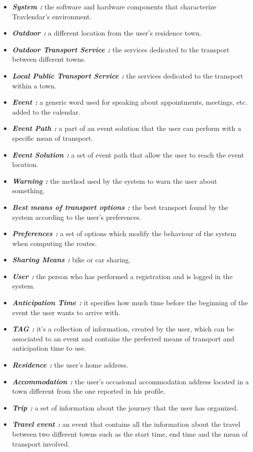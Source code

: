 \newpage
{}
\begin{itemize}
	\setlength{\leftskip}{0.5cm}
	\item \emph{\textbf{System : }}the software and hardware components that characterize Travlendar’s environment.
	\item \emph{\textbf{Outdoor : }}a different location from the user’s residence town.
	\item \emph{\textbf{Outdoor Transport Service : }}the services dedicated to the transport between different towns.
	\item \emph{\textbf{Local Public Transport Service : }}the services dedicated to the transport within a town.
	\item \emph{\textbf{Event : }}a generic word used for speaking about appointments, meetings, etc. added to the calendar.
	\item \emph{\textbf{Event Path : }}a part of an event solution that the user can perform with a specific mean of transport.
	\item \emph{\textbf{Event Solution : }}a set of event path that allow the user to reach the event location.
	\item \emph{\textbf{Warning : }}the method used by the system to warn the user about something.
	\item \emph{\textbf{Best means of transport options : }}the best transport found by the system according to the user’s preferences.
	\item \emph{\textbf{Preferences : }}a set of options which modify the behaviour of the system when computing the routes.
	\item \emph{\textbf{Sharing Means : }}bike or car sharing.
	\item \emph{\textbf{User : }}the person who has performed a registration and is logged in the system.
	\item \emph{\textbf{Anticipation Time : }}it specifies how much time before the beginning of the event the user wants to arrive with.
	\item \emph{\textbf{TAG : }}it’s a collection of information, created by the user, which can be associated to an event and contains the preferred means of transport and anticipation time to use.
	\item \emph{\textbf{Residence : }}the user’s home address.
	\item \emph{\textbf{Accommodation : }}the user’s occasional accommodation address located in a town different from the one reported in his profile.
	\item \emph{\textbf{Trip : }}a set of information about the journey that the user has organized.
	\item \emph{\textbf{Travel event : }}an event that contains all the information about the travel between two different towns such as the start time, end time and the mean of transport involved.
\end{itemize}

